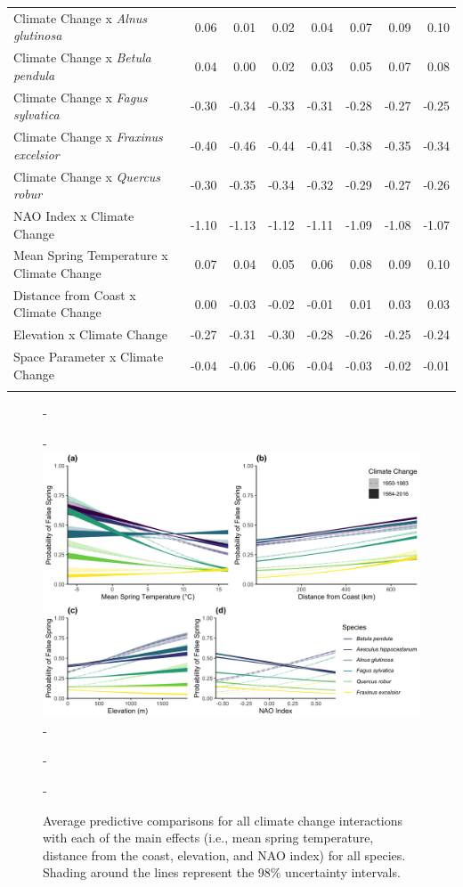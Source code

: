 \documentclass{article}\usepackage[]{graphicx}\usepackage[]{color}
\begin{document}
\begin{longtable}{lrrrrrrr}
  Climate Change
x\textit{ Alnus glutinosa} & 0.06 & 0.01 & 0.02 & 0.04 & 0.07 & 0.09 & 0.10 \\ 
  Climate Change
x\textit{ Betula pendula} & 0.04 & 0.00 & 0.02 & 0.03 & 0.05 & 0.07 & 0.08 \\ 
  Climate Change
x\textit{ Fagus sylvatica} & -0.30 & -0.34 & -0.33 & -0.31 & -0.28 & -0.27 & -0.25 \\ 
  Climate Change
x\textit{ Fraxinus excelsior} & -0.40 & -0.46 & -0.44 & -0.41 & -0.38 & -0.35 & -0.34 \\ 
  Climate Change
x\textit{ Quercus robur} & -0.30 & -0.35 & -0.34 & -0.32 & -0.29 & -0.27 & -0.26 \\ 
  NAO Index x Climate Change & -1.10 & -1.13 & -1.12 & -1.11 & -1.09 & -1.08 & -1.07 \\ 
  Mean Spring 
Temperature x Climate Change & 0.07 & 0.04 & 0.05 & 0.06 & 0.08 & 0.09 & 0.10 \\ 
  Distance from 
Coast x Climate Change & 0.00 & -0.03 & -0.02 & -0.01 & 0.01 & 0.03 & 0.03 \\ 
  Elevation x Climate Change & -0.27 & -0.31 & -0.30 & -0.28 & -0.26 & -0.25 & -0.24 \\ 
  Space Parameter x Climate Change & -0.04 & -0.06 & -0.06 & -0.04 & -0.03 & -0.02 & -0.01 \\ 
   \hline
\hline
\label{tab:suppmodlong}
\end{longtable}



{\begin{figure} [H]
  -\begin{center}
  -\includegraphics[width=16cm]{..//..//analyses/figures/APC_allpred_allspp_baseR_long98.png}
  -\caption{Average predictive comparisons for all climate change interactions with each of the main effects (i.e., mean spring temperature, distance from the coast, elevation, and NAO index) for all species. Shading around the lines represent the 98\% uncertainty intervals. }\label{fig:suppapc}
  -\end{center}
  -\end{figure}}
  
\end{document}
